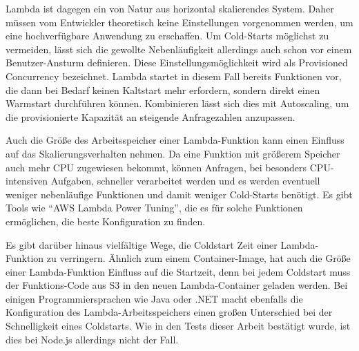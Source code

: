 Lambda ist dagegen ein von Natur aus horizontal skalierendes System. Daher müssen vom Entwickler theoretisch keine Einstellungen vorgenommen werden, um eine hochverfügbare Anwendung zu erschaffen. Um Cold-Starts möglichst zu vermeiden, lässt sich die gewollte Nebenläufigkeit allerdings auch schon vor einem Benutzer-Ansturm definieren. Diese Einstellungsmöglichkeit wird als Provisioned Concurrency bezeichnet. Lambda startet in diesem Fall bereits Funktionen vor, die dann bei Bedarf keinen Kaltstart mehr erfordern, sondern direkt einen Warmstart durchführen können. Kombinieren lässt sich dies mit Autoscaling, um die provisionierte Kapazität an steigende Anfragezahlen anzupassen\cite{amazon_aws_aws_2020}. 

Auch die Größe des Arbeitsspeicher einer Lambda-Funktion kann einen Einfluss auf das Skalierungsverhalten nehmen. Da eine Funktion mit größerem Speicher auch mehr CPU zugewiesen bekommt, können Anfragen, bei besonders CPU-intensiven Aufgaben, schneller verarbeitet werden und es werden eventuell weniger nebenläufige Funktionen und damit weniger Cold-Starts benötigt. Es gibt Tools wie "`AWS Lambda Power Tuning"'\cite{casalboni_alexcasalboniaws-lambda-power-tuning_2021}, die es für solche Funktionen ermöglichen, die beste Konfiguration zu finden.

Es gibt darüber hinaus vielfältige Wege, die Coldstart Zeit einer Lambda-Funktion zu verringern. Ähnlich zum einem Container-Image, hat auch die Größe einer Lambda-Funktion Einfluss auf die Startzeit, denn bei jedem Coldstart muss der Funktions-Code aus \ac{S3} in den neuen Lambda-Container geladen werden. Bei einigen Programmiersprachen wie Java oder .NET macht ebenfalls die Konfiguration des Lambda-Arbeitsspeichers einen großen Unterschied bei der Schnelligkeit eines Coldstarts\cite{malishev_aws_2019}. Wie in den Tests dieser Arbeit bestätigt wurde, ist dies bei Node.js allerdings nicht der Fall.


